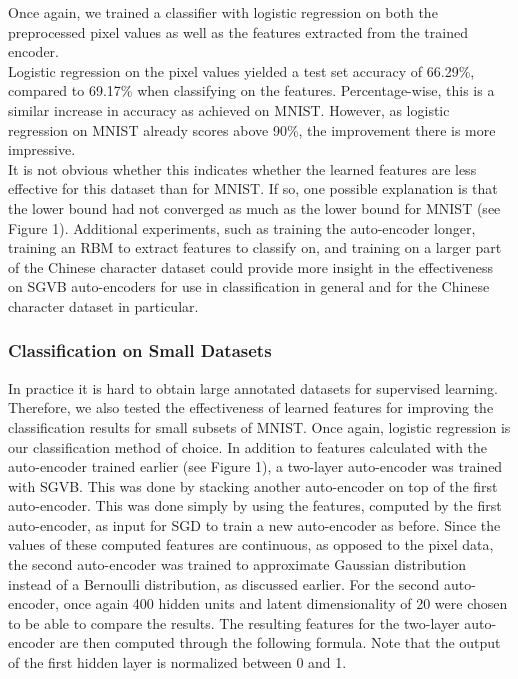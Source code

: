 \documentclass{article}
\begin{document}
Once again, we trained a classifier with logistic regression on both the preprocessed pixel values as well as the features extracted from the trained encoder. \\
Logistic regression on the pixel values yielded a test set accuracy of 66.29\%, compared to 69.17\% when classifying on the features. Percentage-wise, this is a similar increase in accuracy as achieved on MNIST. However, as logistic regression on MNIST already scores above 90\%, the improvement there is more impressive. \\
It is not obvious whether this indicates whether the learned features are less effective for this dataset than for MNIST. If so, one possible explanation is that the lower bound had not converged as much as the lower bound for MNIST (see Figure 1). Additional experiments, such as training the auto-encoder longer, training an RBM to extract features to classify on, and training on a larger part of the Chinese character dataset could provide more insight in the effectiveness on SGVB auto-encoders for use in classification in general and for the Chinese character dataset in particular.


\subsubsection{Classification on Small Datasets}

In practice it is hard to obtain large annotated datasets for supervised learning. Therefore, we also tested the effectiveness of learned features for improving the classification results for small subsets of MNIST. Once again, logistic regression is our classification method of choice. In addition to features calculated with the auto-encoder trained earlier (see Figure 1), a two-layer auto-encoder was trained with SGVB. This was done by stacking another auto-encoder on top of the first auto-encoder. This was done simply by using the features, computed by the first auto-encoder, as input for SGD to train a new auto-encoder as before. Since the values of these computed features are continuous, as opposed to the pixel data, the second auto-encoder was trained to approximate Gaussian distribution instead of a Bernoulli distribution, as discussed earlier. For the second auto-encoder, once again 400 hidden units and latent dimensionality of 20 were chosen to be able to compare the results. The resulting features for the two-layer auto-encoder are then computed through the following formula. Note that the output of the first hidden layer is normalized between 0 and 1.
\end{document}
